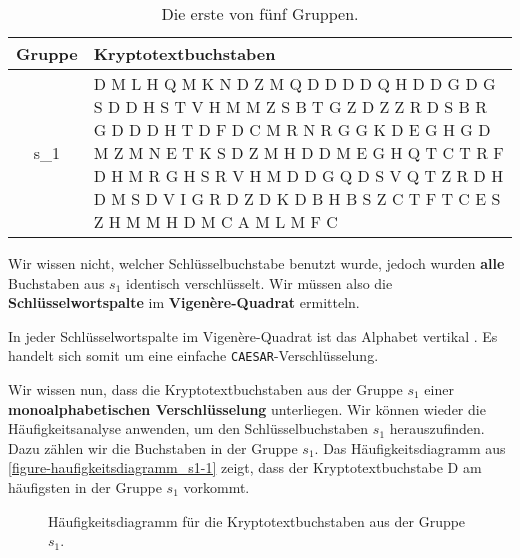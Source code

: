 \begin{table}[htb]
\centering
\begin{tabular}{|c|p{13cm}|}
\hline
\footnotesize Gruppe & \footnotesize Kryptotextbuchstaben                                                                                                                                                                                                                                                                                                         \\ \hline
\footnotesize s\_1   & \footnotesize D M L H Q M K N D Z M Q D D D D Q H D D G D G S D D H S T V H M M Z S B T G Z D Z Z R D S B R G D D D H T D F D C M R N R G G K D E G H G D M Z M N E T K S D Z M H D D M E G H Q T C T R F D H M R G H S R V H M D D G Q D S V Q T Z R D H D M S D V I G R D Z D K D B H B S Z C T F T C E S Z H M M H D M C A M L M F C \\ \hline
\end{tabular}
\caption{Die erste von fünf Gruppen.}
\label{table-s1}
\end{table}

Wir wissen nicht, welcher Schlüsselbuchstabe benutzt wurde, jedoch wurden \textbf{alle} Buchstaben aus $s_1$ identisch verschlüsselt. Wir müssen also die \textbf{Schlüsselwortspalte} im \textbf{Vigenère-Quadrat} ermitteln. 

\begin{important}
In jeder Schlüsselwortspalte im Vigenère-Quadrat ist das Alphabet vertikal . Es handelt sich somit um eine einfache \texttt{CAESAR}-Verschlüsselung.
\end{important}

Wir wissen nun, dass die Kryptotextbuchstaben aus der Gruppe $s_1$ einer \textbf{monoalphabetischen Verschlüsselung} unterliegen. Wir können wieder die Häufigkeitsanalyse anwenden, um den Schlüsselbuchstaben $s_1$ herauszufinden. Dazu zählen wir die Buchstaben in der Gruppe $s_1$. Das Häufigkeitsdiagramm aus \autoref{figure-haufigkeitsdiagramm_s1-1} zeigt, dass der Kryptotextbuchstabe D am häufigsten in der Gruppe $s_1$ vorkommt.

\begin{figure}[htb]
\centering
{}
\caption{Häufigkeitsdiagramm für die Kryptotextbuchstaben aus der Gruppe $s_1$.}
\label{figure-haufigkeitsdiagramm_s1-1}
\end{figure}

